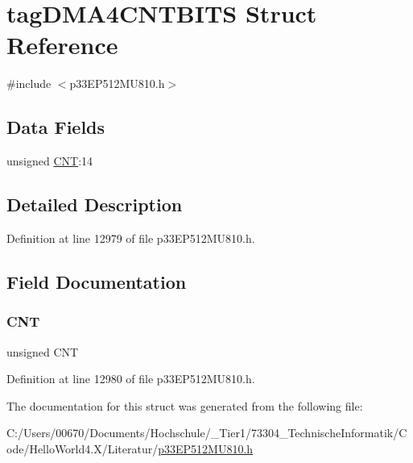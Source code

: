 \hypertarget{structtag_d_m_a4_c_n_t_b_i_t_s}{}\section{tag\+D\+M\+A4\+C\+N\+T\+B\+I\+TS Struct Reference}
\label{structtag_d_m_a4_c_n_t_b_i_t_s}


{\ttfamily \#include $<$p33\+E\+P512\+M\+U810.\+h$>$}

\subsection*{Data Fields}
\begin{DoxyCompactItemize}
\item 
unsigned \hyperlink{structtag_d_m_a4_c_n_t_b_i_t_s_a30be39d82c244f19fd98dd74227487f6}{C\+NT}\+:14
\end{DoxyCompactItemize}


\subsection{Detailed Description}


Definition at line 12979 of file p33\+E\+P512\+M\+U810.\+h.



\subsection{Field Documentation}
\mbox{\label{structtag_d_m_a4_c_n_t_b_i_t_s_a30be39d82c244f19fd98dd74227487f6}} 
\subsubsection{\texorpdfstring{C\+NT}{CNT}}
{\footnotesize\ttfamily unsigned C\+NT}



Definition at line 12980 of file p33\+E\+P512\+M\+U810.\+h.



The documentation for this struct was generated from the following file\+:\begin{DoxyCompactItemize}
\item 
C\+:/\+Users/00670/\+Documents/\+Hochschule/\+\_\+\+Tier1/73304\+\_\+\+Technische\+Informatik/\+Code/\+Hello\+World4.\+X/\+Literatur/\hyperlink{p33_e_p512_m_u810_8h}{p33\+E\+P512\+M\+U810.\+h}\end{DoxyCompactItemize}
